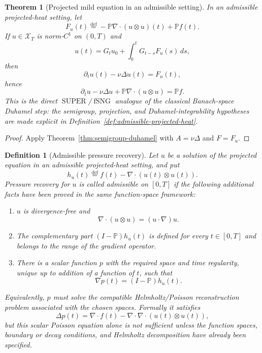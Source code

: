 \documentclass{amsart}
\newtheorem{thm}{Theorem}
\newtheorem{defn}{Definition}
\DeclareMathOperator{\SUPER}{SUPER}
\DeclareMathOperator{\fSNG}{fSNG}
\newcommand{\eqdef}{\overset{\mathrm{def}}{=}}
\begin{document}
\begin{thm}[Projected mild equation in an admissible setting]\label{thm:projected-mild}
In an admissible projected-heat setting, let
\[
  F_u(t)\eqdef -\mathbb{P}\nabla\cdot(u\otimes u)(t)+\mathbb{P}f(t).
\]
If $u\in\mathcal X_T$ is norm-$C^1$ on $(0,T)$ and
\[
  u(t)=G_tu_0+\int_0^tG_{t-s}F_u(s)\,ds,
\]
then
\[
  \partial_tu(t)-\nu\Delta u(t)=F_u(t),
\]
hence
\[
  \partial_tu-\nu\Delta u+\mathbb{P}\nabla\cdot(u\otimes u)=\mathbb{P}f.
\]
This is the direct $\SUPER$/$\fSNG$ analogue of the classical Banach-space
Duhamel step: the semigroup, projection, and Duhamel-integrability hypotheses
are made explicit in Definition~\ref{def:admissible-projected-heat}.
\end{thm}

\begin{proof}
Apply Theorem~\ref{thm:semigroup-duhamel} with $A=\nu\Delta$ and
$F=F_u$.
\end{proof}

\begin{defn}[Admissible pressure recovery]\label{def:pressure-recovery}
Let $u$ be a solution of the projected equation in an admissible
projected-heat setting, and put
\[
  h_u(t)\eqdef f(t)-\nabla\cdot(u(t)\otimes u(t)).
\]
Pressure recovery for $u$ is called admissible on $[0,T]$ if the following
additional facts have been proved in the same function-space framework:
\begin{enumerate}
\item $u$ is divergence-free and
\[
  \nabla\cdot(u\otimes u)=(u\cdot\nabla)u .
\]
\item The complementary part $(I-\mathbb{P})h_u(t)$ is defined for every
$t\in[0,T]$ and belongs to the range of the gradient operator.
\item There is a scalar function $p$ with the required space and time
regularity, unique up to addition of a function of $t$, such that
\[
  \nabla p(t)=(I-\mathbb{P})h_u(t).
\]
\end{enumerate}
Equivalently, $p$ must solve the compatible Helmholtz/Poisson reconstruction
problem associated with the chosen spaces.  Formally it satisfies
\[
  \Delta p(t)=\nabla\cdot f(t)
  -\nabla\cdot\nabla\cdot(u(t)\otimes u(t)),
\]
but this scalar Poisson equation alone is not sufficient unless the function
spaces, boundary or decay conditions, and Helmholtz decomposition have already
been specified.
\end{defn}
\end{document}
